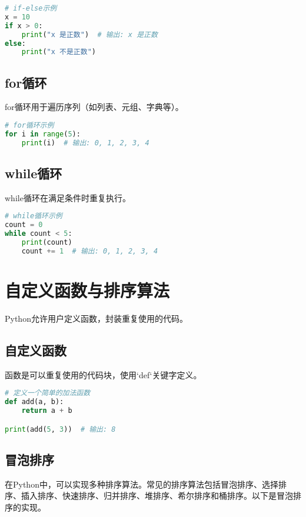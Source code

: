 \documentclass{article}
\begin{document}
\begin{lstlisting}[language=Python,caption=if-else语句示例]
# if-else示例
x = 10
if x > 0:
    print("x 是正数")  # 输出: x 是正数
else:
    print("x 不是正数")
\end{lstlisting}

\subsection{for循环}
for循环用于遍历序列（如列表、元组、字典等）。

\begin{lstlisting}[language=Python,caption=for循环示例]
# for循环示例
for i in range(5):
    print(i)  # 输出: 0, 1, 2, 3, 4
\end{lstlisting}

\subsection{while循环}
while循环在满足条件时重复执行。

\begin{lstlisting}[language=Python,caption=while循环示例]
# while循环示例
count = 0
while count < 5:
    print(count)
    count += 1  # 输出: 0, 1, 2, 3, 4
\end{lstlisting}

\section{自定义函数与排序算法}
Python允许用户定义函数，封装重复使用的代码。

\subsection{自定义函数}
函数是可以重复使用的代码块，使用`def`关键字定义。

\begin{lstlisting}[language=Python,caption=自定义函数示例]
# 定义一个简单的加法函数
def add(a, b):
    return a + b

print(add(5, 3))  # 输出: 8
\end{lstlisting}

\subsection{冒泡排序}
在Python中，可以实现多种排序算法。常见的排序算法包括冒泡排序、选择排序、插入排序、快速排序、归并排序、堆排序、希尔排序和桶排序。以下是冒泡排序的实现。
\end{document}
